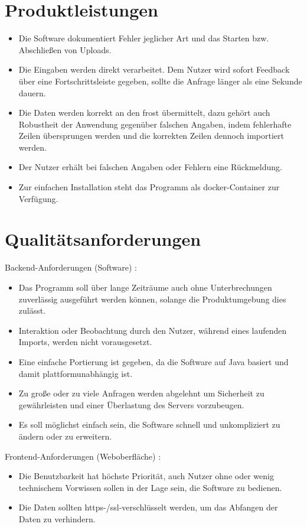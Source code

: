 \documentclass[a4paper, 12 pt]{article}
\begin{document}
	\section{Produktleistungen}
	\begin{itemize}
		\item Die Software dokumentiert Fehler jeglicher Art und das Starten bzw. Abschließen von Uploads.
		\item Die Eingaben werden direkt verarbeitet. Dem Nutzer wird sofort Feedback über eine Fortschrittsleiste gegeben, sollte die Anfrage länger als eine Sekunde dauern.
		\item Die Daten werden korrekt an den \gls{frost} übermittelt, dazu gehört auch Robustheit der Anwendung gegenüber falschen Angaben, indem fehlerhafte Zeilen übersprungen werden und die korrekten Zeilen dennoch importiert werden.
		\item Der Nutzer erhält bei falschen Angaben oder Fehlern eine Rückmeldung.
		\item Zur einfachen Installation steht das Programm als \gls{docker}-Container zur Verfügung.
	\end{itemize}
	
	
	\section{Qualitätsanforderungen}
	Backend-Anforderungen (Software) :
	\begin{itemize}
	\item Das Programm soll über lange Zeiträume auch ohne Unterbrechungen zuverlässig ausgeführt werden können, solange die Produktumgebung dies zulässt.
	\item Interaktion oder Beobachtung durch den Nutzer, während eines laufenden Imports, werden nicht vorausgesetzt.
	\item Eine einfache Portierung ist gegeben, da die Software auf Java basiert und damit plattformunabhängig ist. 
	\item Zu große oder zu viele Anfragen werden abgelehnt um Sicherheit zu gewährleisten und einer Überlastung des Servers vorzubeugen.
	\item Es soll möglichst einfach sein, die Software schnell und unkompliziert zu ändern oder zu erweitern.
	\end{itemize}
	Frontend-Anforderungen (Weboberfläche) :
	\begin{itemize}
	\item Die Benutzbarkeit hat höchste Priorität, auch Nutzer ohne oder wenig technischem Vorwissen sollen in der Lage sein, die Software zu bedienen.
	\item Die Daten sollten \gls{https}-/\gls{ssl}-verschlüsselt werden, um das Abfangen der Daten zu verhindern.
	\end{itemize}
	
\end{document}
